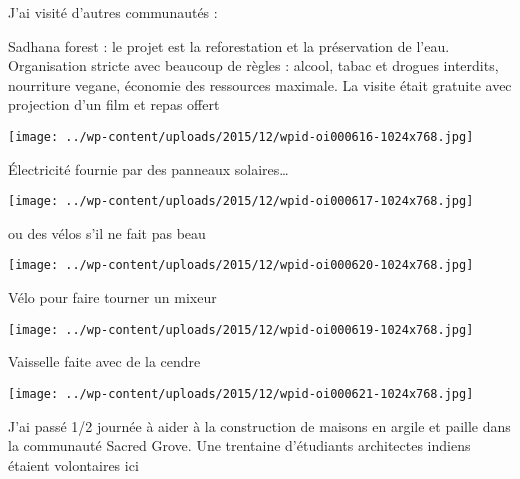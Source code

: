 

 J'ai visité d'autres communautés : 

 Sadhana forest : le projet est la reforestation et la préservation de l'eau. Organisation stricte avec beaucoup de règles : alcool, tabac et drogues interdits, nourriture vegane, économie des ressources maximale. La visite était gratuite avec projection d'un film et repas offert 

 

\begin{center} \texttt{[image: ../wp-content/uploads/2015/12/wpid-oi000616-1024x768.jpg]} \end{center}

 

 Électricité fournie par des panneaux solaires… 

 

\begin{center} \texttt{[image: ../wp-content/uploads/2015/12/wpid-oi000617-1024x768.jpg]} \end{center}

 

 ou des vélos s'il ne fait pas beau 

 

\begin{center} \texttt{[image: ../wp-content/uploads/2015/12/wpid-oi000620-1024x768.jpg]} \end{center}

 

 Vélo pour faire tourner un mixeur 

 

\begin{center} \texttt{[image: ../wp-content/uploads/2015/12/wpid-oi000619-1024x768.jpg]} \end{center}

 

 Vaisselle faite avec de la cendre 

 

\begin{center} \texttt{[image: ../wp-content/uploads/2015/12/wpid-oi000621-1024x768.jpg]} \end{center}

 

 J'ai passé 1/2 journée à aider à la construction de maisons en argile et paille dans la communauté Sacred Grove. Une trentaine d'étudiants architectes indiens étaient volontaires ici 

